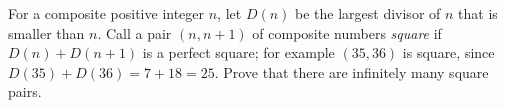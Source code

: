 For a composite positive integer $n$, let $D(n)$ be the largest divisor of $n$ that is smaller than $n$. Call a pair $(n,n+1)$ of composite numbers \emph{square} if $D(n)+D(n+1)$ is a perfect square; for example $(35,36)$ is square, since $D(35)+D(36)=7+18=25$. Prove that there are infinitely many square pairs.
